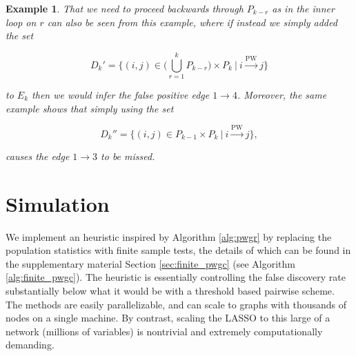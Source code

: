 \documentclass{statsoc}
\def\pwgc{\overset{\text{PW}}{\rightarrow}}  %
\newtheorem{example}{Example}
\begin{document}
\begin{example}
  That we need to proceed backwards through $P_{k - r}$ as in the
  inner loop on $r$ can also be seen from this example, where if
  instead we simply added the set

  \begin{equation*}
    D_k' = \{(i, j) \in \Big(\bigcup_{r = 1}^k P_{k - r}\Big) \times P_k\ |\ i \pwgc j \}
  \end{equation*}

  to $E_k$ then we would infer the false positive edge
  $1 \rightarrow 4$.  Moreover, the same example shows that simply
  using the set

  \begin{equation*}
    D_k'' = \{(i, j) \in P_{k - 1} \times P_k\ |\ i \pwgc j \}  ,
  \end{equation*}

  causes the edge $1 \rightarrow 3$ to be missed.
\end{example}




\section{Simulation}
\label{sec:simulation}
We implement an heuristic inspired by Algorithm \ref{alg:pwgr} by
replacing the population statistics with finite sample tests, the
details of which can be found in the supplementary material Section
\ref{sec:finite_pwgc} (see Algorithm \ref{alg:finite_pwgc}).  The
heuristic is essentially controlling the false discovery rate
substantially below what it would be with a threshold based pairwise
scheme.  The methods are easily parallelizable, and can scale to
graphs with thousands of nodes on a single machine.  By contrast,
scaling the LASSO to this large of a network (millions of variables)
is nontrivial and extremely computationally demanding.
\end{document}
